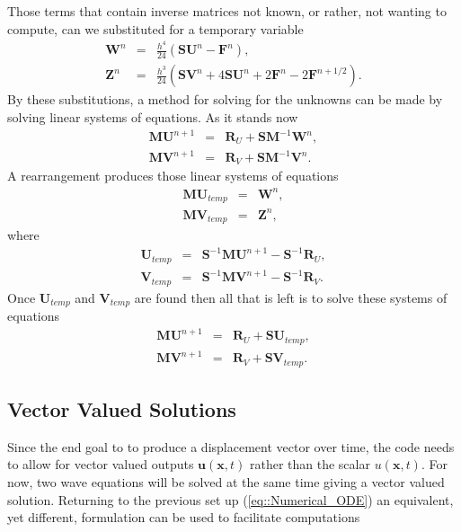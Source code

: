 Those terms that contain inverse matrices not known, or rather, not wanting to compute, can we substituted for a temporary variable
\begin{eqnarray*}
  \bm{W}^n & = & \frac{h^4}{24}(\bm{SU}^n - \bm{F}^n), \\
  \bm{Z}^n & = & \frac{h^3}{24}(\bm{SV}^n + 4\bm{SU}^n + 2\bm{F}^n - 2\bm{F}^{n+1/2}).
\end{eqnarray*}
By these substitutions, a method for solving for the unknowns can be made by solving linear systems of equations. As it stands now
\begin{eqnarray*}
  \bm{MU}^{n+1} & = & \bm{R}_U + \bm{SM}^{-1}\bm{W}^n, \\
  \bm{MV}^{n+1} & = & \bm{R}_V + \bm{SM}^{-1}\bm{V}^n.
\end{eqnarray*}
A rearrangement produces those linear systems of equations
\begin{eqnarray*}
  \bm{M}\bm{U}_{temp} & = & \bm{W}^n, \\
  \bm{M}\bm{V}_{temp} & = & \bm{Z}^n,
\end{eqnarray*}
where
\begin{eqnarray*}
  \bm{U}_{temp} & = & \bm{S}^{-1}\bm{MU}^{n+1} - \bm{S}^{-1}\bm{R}_U, \\
  \bm{V}_{temp} & = & \bm{S}^{-1}\bm{MV}^{n+1} - \bm{S}^{-1}\bm{R}_V.
\end{eqnarray*}
Once $\bm{U}_{temp}$ and $\bm{V}_{temp}$ are found then all that is left is to solve these systems of equations
\begin{eqnarray*}
  \bm{MU}^{n+1} & = & \bm{R}_U + \bm{SU}_{temp}, \\
  \bm{MV}^{n+1} & = & \bm{R}_V + \bm{SV}_{temp}.
\end{eqnarray*}

\subsection{Vector Valued Solutions}
Since the end goal to to produce a displacement vector over time, the code needs to allow for vector valued outputs $\bm{u}(\bm{x},t)$ rather than the scalar $u(\bm{x},t)$. For now, two wave equations will be solved at the same time giving a vector valued solution. Returning to the previous set up (\ref{eq::Numerical_ODE}) an equivalent, yet different, formulation can be used to facilitate computations
